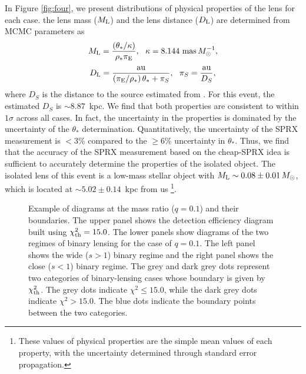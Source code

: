 \documentclass[10pt]{emulateapj}
\begin{document}
 In Figure \ref{fig:four}, we present distributions of physical properties of the lens for each case. 
the lens mass ($M_{\rm L}$) and the lens distance ($D_{\rm L}$) are determined from MCMC parameters as
\begin{equation}
M_{\rm L} = {(\theta_{\ast}/\kappa) \over {\rho_{\ast}\pi_{\rm E}}},~~\kappa = 8.144 ~{\rm mas}\, M_{\odot}^{-1},
\end{equation}
\begin{equation}
D_{\rm L} ={ {\rm au} \over {(\pi_{\rm E}/\rho_{\ast})\,\theta_{\ast} + \pi_{S}} }, ~~\pi_{S} ={ {\rm au} \over D_{S} },
\end{equation}
where $D_{S}$ is the distance to the source estimated from \citet{nataf13}. 
For this event, the estimated $D_{S}$ is $\sim 8.87\,$ kpc. We find that both properties are consistent 
to within $1\sigma$ across all cases. In fact, the uncertainty in the properties is dominated by the 
uncertainty of the $\theta_{\ast}$ determination. Quantitatively, the uncertainty of the SPRX measurement 
is $< 3\%$ compared to the $\ge 6\%$ uncertainty in $\theta_{\ast}$. Thus, we find that the accuracy of 
the SPRX measurement based on the cheap-SPRX idea is sufficient to accurately determine the properties 
of the isolated object. The isolated lens of this event is a low-mass stellar object with $M_{\rm L}\sim 
0.08\pm0.01\, M_{\odot}$, which is located at $\sim 5.02\pm0.14\,$ kpc from us \footnote[3]{These values 
of physical properties are the simple mean values of each property, with the uncertainty determined 
through standard error propagation.}.

\begin{figure*}[htb!]
\caption{
Example of diagrams at the mass ratio ($q=0.1$) and their boundaries. The upper panel shows 
the detection efficiency diagram built using $\chi^2_{\rm th}=15.0$. The lower panels show 
diagrams of the two regimes of binary lensing for the case of $q=0.1$. The left panel shows 
the wide ($s>1$) binary regime and the right panel shows the close ($s<1$) binary regime. 
The grey and dark grey dots represent two categories of binary-lensing cases whose boundary 
is given by $\chi^2_{\rm th}$. The grey dots indicate $\chi^2 \le 15.0$, while the dark grey 
dots indicate $\chi^2 > 15.0$. The blue dots indicate the boundary points between the two 
categories.
\label{fig:five}}
\end{figure*}
\end{document}
